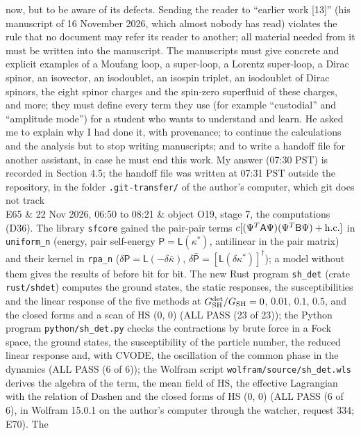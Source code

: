 \documentclass[
  10pt,
]{article}
\begin{document}
\begin{longtable}[]
now, but to be aware of its defects. Sending the reader to ``earlier
work {[}13{]}'' (his manuscript of 16 November 2026, which almost nobody
has read) violates the rule that no document may refer its reader to
another; all material needed from it must be written into the
manuscript. The manuscripts must give concrete and explicit examples of
a Moufang loop, a super-loop, a Lorentz super-loop, a Dirac spinor, an
isovector, an isodoublet, an isospin triplet, an isodoublet of Dirac
spinors, the eight spinor charges and the spin-zero superfluid of these
charges, and more; they must define every term they use (for example
``custodial'' and ``amplitude mode'') for a student who wants to
understand and learn. He asked me to explain why I had done it, with
provenance; to continue the calculations and the analysis but to stop
writing manuscripts; and to write a handoff file for another assistant,
in case he must end this work. My answer (07:30 PST) is recorded in
Section 4.5; the handoff file was written at 07:31 PST outside the
repository, in the folder \texttt{.git-transfer/} of the author's
computer, which git does not track \\
E65 & 22 Nov 2026, 06:50 to 08:21 & object O19, stage 7, the
computations (D36). The library \texttt{sfcore} gained the pair-pair
terms \(c[(\Psi^T\mathsf A\Psi)(\Psi^T\mathsf B\Psi)+{\rm h.c.}]\) in
\texttt{uniform\_n} (energy, pair self-energy
\(\mathsf P=\mathsf L(\kappa^*)\), antilinear in the pair matrix) and
their kernel in \texttt{rpa\_n}
(\(\delta\mathsf P=\mathsf L(-\delta\bar\kappa)\),
\(\delta\bar{\mathsf P}=[\mathsf L(\delta\kappa^*)]^\dagger\)); a model
without them gives the results of before bit for bit. The new Rust
program \texttt{sh\_det} (crate \texttt{rust/shdet}) computes the ground
states, the static responses, the susceptibilities and the linear
response of the five methods at \(G^{\rm det}_{\rm SH}/G_{\rm SH}=0\),
\(0.01\), \(0.1\), \(0.5\), and the closed forms and a scan of HS (0, 0)
(ALL PASS (23 of 23)); the Python program \texttt{python/sh\_det.py}
checks the contractions by brute force in a Fock space, the ground
states, the susceptibility of the particle number, the reduced linear
response and, with CVODE, the oscillation of the common phase in the
dynamics (ALL PASS (6 of 6)); the Wolfram script
\texttt{wolfram/source/sh\_det.wls} derives the algebra of the term, the
mean field of HS, the effective Lagrangian with the relation of Dashen
and the closed forms of HS (0, 0) (ALL PASS (6 of 6), in Wolfram 15.0.1
on the author's computer through the watcher, request 334; E70). The

\end{longtable}
\end{document}
